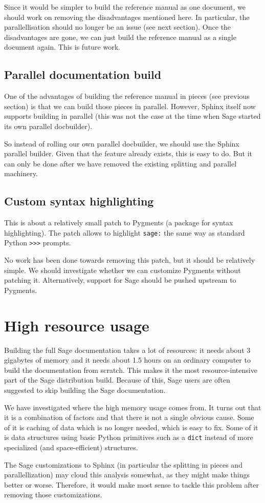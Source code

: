 \documentclass{deliverablereport}
\begin{document}
Since it would be simpler to build the reference manual as one document,
we should work on removing the disadvantages mentioned here.
In particular, the parallellisation should no longer be an issue
(see next section).
Once the disadvantages are gone, we can just build the reference manual
as a single document again.
This is future work.

\subsection{Parallel documentation build}

One of the advantages of building the reference manual in pieces
(see previous section) is that we can build those pieces in parallel.
However, Sphinx itself now supports building in parallel
(this was not the case at the time when Sage started its own parallel docbuilder).

So instead of rolling our own parallel docbuilder,
we should use the Sphinx parallel builder.
Given that the feature already exists, this is easy to do.
But it can only be done after we have removed the existing
splitting and parallel machinery.

\subsection{Custom syntax highlighting}

This is about a relatively small patch to Pygments
(a package for syntax highlighting).
The patch allows to highlight \texttt{sage:} the same way
as standard Python \texttt{>>>} prompts.

No work has been done towards removing this patch,
but it should be relatively simple.
We should investigate whether we can customize Pygments without
patching it.
Alternatively, support for Sage should be pushed upstream to Pygments.

\section{High resource usage}

Building the full Sage documentation takes a lot of resources:
it needs about 3 gigabytes of memory and it needs about 1.5 hours
on an ordinary computer to build the documentation from scratch.
This makes it the most resource-intensive part of the
Sage distribution build.
Because of this, Sage users are often suggested to skip building
the Sage documentation.

We have investigated where the high memory usage comes from.
It turns out that it is a combination of factors
and that there is not a single obvious cause.
Some of it is caching of data which is no longer needed,
which is easy to fix.
Some of it is data structures using basic Python primitives such as a \texttt{dict}
instead of more specialized (and space-efficient) structures.

The Sage customizations to Sphinx
(in particular the splitting in pieces and parallellization)
may cloud this analysis somewhat,
as they might make things better or worse.
Therefore, it would make most sense to tackle this problem after
removing those customizations.
\end{document}
